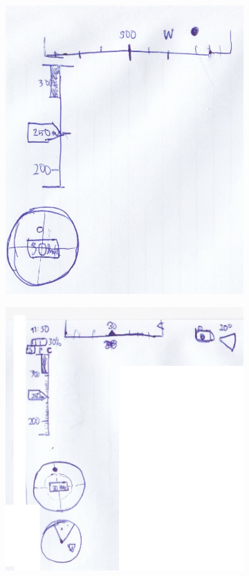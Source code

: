 \begin{figure}[H]
    \centering
    \begin{subfigure}[t]{0.46\linewidth}
        \centering
        \includegraphics[width=\linewidth]{obrazky-figures/navrh/staticHudWired.png}
    \end{subfigure}
    \hfill
    \begin{subfigure}[t]{0.5\linewidth}
        \centering
        \includegraphics[width=\linewidth]{obrazky-figures/navrh/staticHud2Wired.jpg}

\end{subfigure}
\end{figure}
